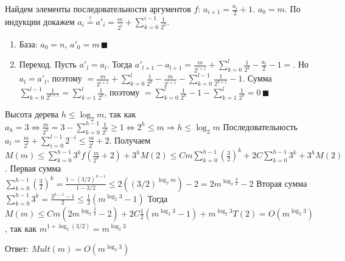 \documentclass[a4paper]{article}
\begin{document}
\begin{enumerate}
\newline
Найдем элементы последовательности аргументов $f$:\newline
$a_{i+1}=\frac{a_i}{2}+1$. $a_0=m$. По индукции докажем $a_i\overset{?}{=}a'_i=\frac{m}{2^i}+\sum\limits_{k=0}^{i-1}\frac{1}{2^k}$.
\begin{enumerate}
\item База: $a_0=n$, $a'_0=m\,\blacksquare$
\item Переход. Пусть $a'_l=a_l$. Тогда $a'_{l+1}-a_{l+1}=\frac{m}{2^{i+1}}+\sum\limits_{k=0}^{l}\frac{1}{2^k}-\frac{a_l}{2}-1\boxed{=}$. Но $a_l=a'_l$, поэтому\newline
$\boxed{=}\frac{m}{2^{i+1}}+\sum\limits_{k=0}^{l}\frac{1}{2^k}-\frac{m}{2^{i+1}}-\sum\limits_{k=0}^{l-1}\frac{1}{2^{k+1}}-1$. Сумма $\sum\limits_{k=0}^{l-1}\frac{1}{2^{k+1}}=\sum\limits_{k=1}^{l}\frac{1}{2^k}$, поэтому $\boxed{=}\sum\limits_{k=0}^{l}\frac{1}{2^k}-1-\sum\limits_{k=1}^{l}\frac{1}{2^k}=0\,\blacksquare$
\end{enumerate}
Высота дерева $h\leqslant \log_2 m$, так как $a_h=3\Leftrightarrow \frac{m}{2^h}=3-\sum\limits_{k=0}^{h-1}\frac{1}{2^k}\geqslant 1\Leftrightarrow 2^h\leqslant m\Rightarrow h\leqslant\log_2 m$
\newline
Последовательность $a_l=\frac{m}{2^l}+\sum\limits_{i=0}^{l-1}2^{-i}\leqslant\frac{m}{2^l}+2$.
Получаем $M(m)\leqslant \sum\limits_{k=0}^{h-1}3^kf(\frac{m}{2^k}+2)+3^hM(2)\leqslant Cm\sum\limits_{k=0}^{h-1}(\frac{3}{2})^k+2C\sum\limits_{k=0}^{h-1}3^k+3^hM(2)$.
Первая сумма $\sum\limits_{k=0}^{h-1}(\frac{3}{2})^k=\frac{1-(3/2)^{h-1}}{1-3/2}
\leqslant
2((3/2)^{\log_2 m})-2=2m^{\log_2 \frac{3}{2}}-2$\newline
Вторая сумма $\sum\limits_{k=0}^{h-1}3^k=\frac{3^{h-1}-1}{2}
\leqslant
\frac{1}{2}(m^{\log_2 3}-1)$\newline
Тогда $M(m)\leqslant Cm(2m^{\log_2 \frac{3}{2}}-2)+2C\frac{1}{2}(m^{\log_2 3}-1)+m^{\log_2 3}T(2)=O(m^{\log_2 3})$, так как $m^{1+\log_2(3/2)}=m^{\log_2 3}$
\end{enumerate}
Ответ: $\boxed{Mult(m)=O(m^{\log_2 3})}$
\end{document}
